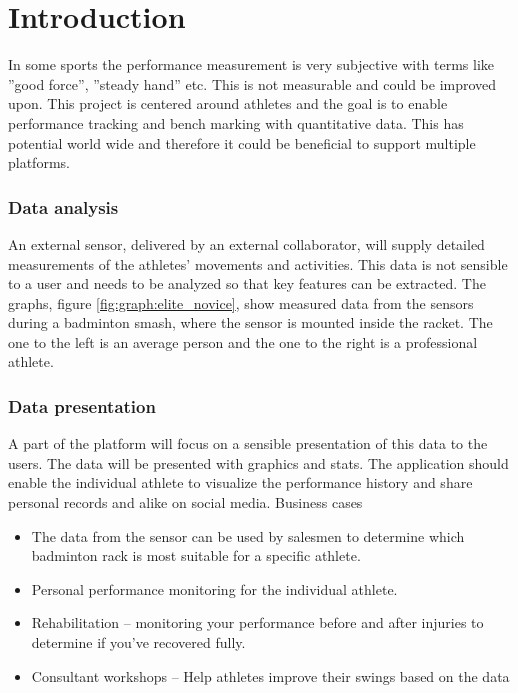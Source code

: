 \chapter{Introduction}

In some sports the performance measurement is very subjective with terms like ''good force'',
''steady hand'' etc. This is not measurable and could be improved upon. This project is centered
around athletes and the goal is to enable performance tracking and bench marking with
quantitative data. This has potential world wide and therefore it could be beneficial to support
multiple platforms.

\subsection*{Data analysis}
An external sensor, delivered by an external collaborator, will supply detailed measurements of the
athletes’ movements and activities. This data is not sensible to a user and needs to be analyzed
so that key features can be extracted. The graphs, figure \ref{fig:graph:elite_novice}, show measured data from the sensors
during a badminton smash, where the sensor is mounted inside the racket. The one to the left is
an average person and the one to the right is a professional athlete.


\subsection*{Data presentation}
A part of the platform will focus on a sensible presentation of this data to the users. The data will
be presented with graphics and stats. The application should enable the individual athlete to
visualize the performance history and share personal records and alike on social media.
Business cases
\begin{itemize}
	\item The data from the sensor can be used by salesmen to determine which badminton rack is most suitable for a specific athlete.
	\item Personal performance monitoring for the individual athlete.
	\item Rehabilitation – monitoring your performance before and after injuries to determine if you’ve recovered fully.
	\item Consultant workshops – Help athletes improve their swings based on the data
\end{itemize}
